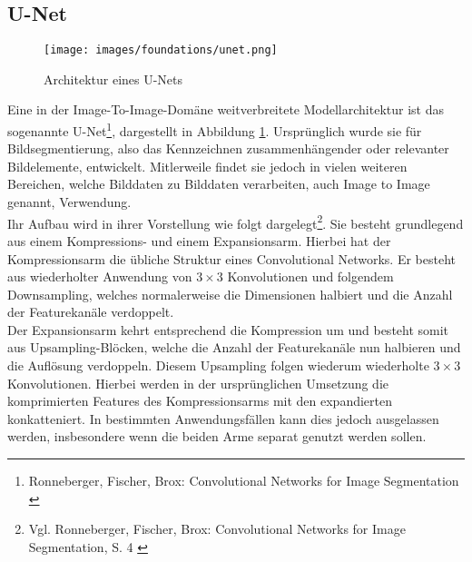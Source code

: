 


\subsection{U-Net}
\label{subsec:Unet}

\begin{figure}[ht]
    \centering
    \texttt{[image: images/foundations/unet.png]} 
    \caption{Architektur eines U-Nets \cite{ronneberger2015unetconvolutionalnetworksbiomedical}}
    \label{fig:unet}
\end{figure}
Eine in der Image-To-Image-Domäne weitverbreitete Modellarchitektur ist das sogenannte U-Net\footnote{
    Ronneberger, Fischer, Brox: Convolutional Networks for Image Segmentation
    \cite{ronneberger2015unetconvolutionalnetworksbiomedical}
}, dargestellt in Abbildung \ref{fig:unet}. Ursprünglich wurde sie für Bildsegmentierung, also das Kennzeichnen zusammenhängender oder relevanter Bildelemente, entwickelt. Mitlerweile findet sie jedoch in vielen weiteren Bereichen, welche Bilddaten zu Bilddaten verarbeiten, auch Image to Image genannt, Verwendung. \\
Ihr Aufbau wird in ihrer Vorstellung wie folgt dargelegt\footnote{
    Vgl. Ronneberger, Fischer, Brox: Convolutional Networks for Image Segmentation, S. 4
    \cite{ronneberger2015unetconvolutionalnetworksbiomedical}
}. Sie besteht grundlegend aus einem Kompressions- und einem Expansionsarm. Hierbei hat der Kompressionsarm die übliche Struktur eines Convolutional Networks. Er besteht aus wiederholter Anwendung von $3\times3$ Konvolutionen und folgendem Downsampling, welches normalerweise die Dimensionen halbiert und die Anzahl der Featurekanäle verdoppelt. \\
Der Expansionsarm kehrt entsprechend die Kompression um und besteht somit aus Upsampling-Blöcken, welche die Anzahl der Featurekanäle nun halbieren und die Auflösung verdoppeln. Diesem Upsampling folgen wiederum wiederholte $3\times3$ Konvolutionen. Hierbei werden in der ursprünglichen Umsetzung die komprimierten Features des Kompressionsarms mit den expandierten konkatteniert. In bestimmten Anwendungsfällen kann dies jedoch ausgelassen werden, insbesondere wenn die beiden Arme separat genutzt werden sollen. 


